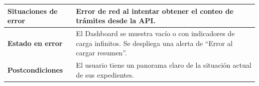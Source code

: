 \begin{longtable}{|p{3.5cm}|p{2cm}|p{2.5cm}|p{7cm}|}
\textbf{Situaciones de error} & \multicolumn{3}{p{11.5cm}|}{Error de red al intentar obtener el conteo de trámites desde la API.} \\ \hline
\textbf{Estado en error} & \multicolumn{3}{p{11.5cm}|}{El Dashboard se muestra vacío o con indicadores de carga infinitos. Se despliega una alerta de ``Error al cargar resumen''.} \\ \hline
\textbf{Postcondiciones} & \multicolumn{3}{p{11.5cm}|}{El usuario tiene un panorama claro de la situación actual de sus expedientes.} \\ \hline
\end{longtable}
\endgroup

\vspace{0.8cm}

\begingroup
\setlength{\parskip}{0pt}
